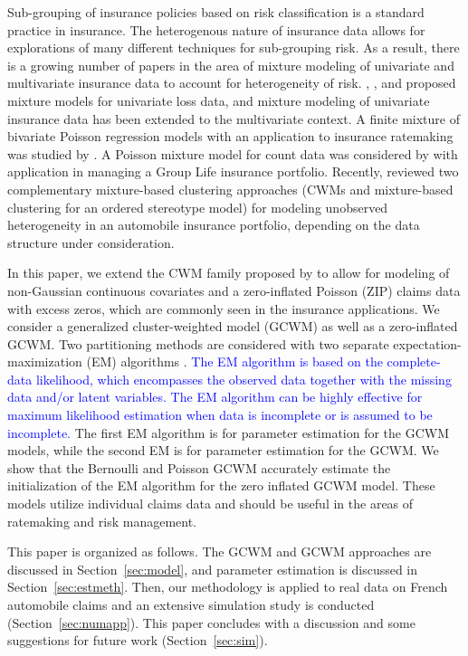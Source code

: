 \documentclass[11pt,letterpaper]{article}
\numberwithin{equation}{section}
\numberwithin{equation}{section}
\numberwithin{equation}{section}
\begin{document}
Sub-grouping of insurance policies based on risk classification is a standard practice in insurance. The heterogenous nature of insurance data allows for explorations of many different techniques for sub-grouping risk. As a result, there is a growing number of papers in the area of mixture modeling of univariate and multivariate insurance data to account for heterogeneity of risk. \cite{Lee+Lin:2010}, \cite{Verbelen+Gong+Antonio+Badescu+Lin:2015}, and \cite{Miljkovic+Grun:2016} proposed mixture models for univariate loss data, and mixture modeling of univariate insurance data has been extended to the multivariate context. A finite mixture of bivariate Poisson regression models with an application to insurance ratemaking was studied by \cite{Bermudez+Karlis:2012}. A Poisson mixture model for count data was considered by \cite{Brown+Buckley:2015} with application in managing a Group Life insurance portfolio. Recently, \cite{risks_miljkovic} reviewed two complementary mixture-based clustering approaches (CWMs and mixture-based clustering for an ordered stereotype model) for modeling unobserved heterogeneity in an automobile insurance portfolio, depending on the data structure under consideration. 

In this paper, we extend the CWM family proposed by \cite{Ingrassia+Punzo+Vittadini+Minotti:2015} to allow for modeling of non-Gaussian continuous covariates and a zero-inflated Poisson (ZIP) claims data with excess zeros, which are commonly seen in the insurance applications. We consider a generalized cluster-weighted model (GCWM) as well as a zero-inflated GCWM. Two partitioning methods are considered with two separate expectation-maximization (EM) algorithms \citep{Dempster+Laird+Rubin:1977}. \textcolor{blue} {The EM algorithm is based on the complete-data likelihood, which encompasses the observed data together with the missing data and/or latent variables. The EM algorithm can be highly effective for maximum likelihood estimation when data is incomplete or is assumed to be incomplete.} The first EM algorithm is for parameter estimation for the GCWM models, while the second EM is for parameter estimation for the GCWM. We show that the Bernoulli and Poisson GCWM accurately estimate the initialization of the EM algorithm for the zero inflated GCWM model. These models utilize individual claims data and should be useful in the areas of ratemaking and risk management.

This paper is organized as follows. The GCWM and GCWM approaches are discussed in Section~\ref{sec:model}, and parameter estimation is discussed in Section~\ref{sec:estmeth}. Then, our methodology is applied to real data on French automobile claims and an extensive simulation study is conducted (Section~\ref{sec:numapp}). This paper concludes with a discussion and some suggestions for future work (Section~\ref{sec:sim}).
\end{document}
